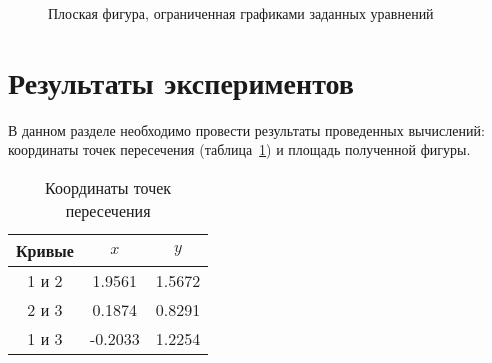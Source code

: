 \documentclass[a4paper,12pt,titlepage,finall]{article}
\begin{document}
\begin{figure}[hh]
\centering
{}
\caption{Плоская фигура, ограниченная графиками заданных уравнений}
\label{plot2}
\end{figure}

\newpage

\section{Результаты экспериментов}

В данном разделе необходимо провести результаты проведенных вычислений:
координаты точек пересечения (таблица~\ref{table1}) и площадь полученной фигуры.

\begin{table}[h]
\centering
\begin{tabular}{|c|c|c|}
\hline
Кривые & $x$ & $y$ \\
\hline
1 и 2 &  1.9561 & 1.5672 \\
2 и 3 &  0.1874 & 0.8291 \\
1 и 3 & -0.2033 & 1.2254 \\
\hline
\end{tabular}
\caption{Координаты точек пересечения}
\label{table1}
\end{table}
\end{document}
